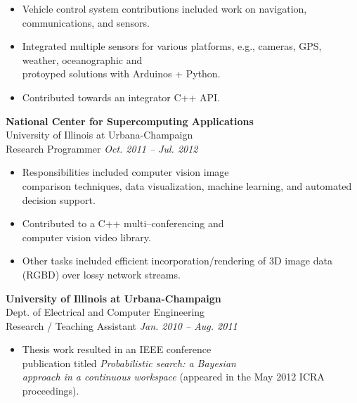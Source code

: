 \documentclass{article}
\begin{document}
{\begin{multicols}{2}
    \begin{itemize}[noitemsep,nolistsep]
        \item Vehicle control system contributions included work on navigation, communications, and sensors.
        \item Integrated multiple sensors for various platforms, e.g., cameras, GPS, weather, oceanographic and \\protoyped solutions with Arduinos + Python.
        \item Contributed towards an integrator C++ API.
    \end{itemize}
    \vspace{10px}
    \textbf{National Center for Supercomputing Applications}\\
    University of Illinois at Urbana-Champaign\\
    Research Programmer \hfill \textsl{Oct. 2011 -- Jul. 2012}\\
    \vspace{ -10px}
    \begin{itemize}[noitemsep,nolistsep]
        \item Responsibilities included computer vision image \\comparison techniques, data visualization, machine learning, and automated decision support. 
        \item Contributed to a C++ multi--conferencing and \\computer vision video library.  
        \item Other tasks included efficient incorporation/rendering of 3D image data (RGBD) over lossy network streams.  
    \end{itemize}
    \vspace{10px}
    \textbf{University of Illinois at Urbana-Champaign}\\ 
    Dept. of Electrical and Computer Engineering\\
    Research / Teaching Assistant \hfill \textsl{Jan. 2010 -- Aug. 2011} \\
    \vspace{ -10px}
    \begin{itemize}[noitemsep,nolistsep]
	 \item Thesis work resulted in an IEEE conference \\publication titled \textsl{Probabilistic search: a Bayesian \\approach in a continuous workspace} (appeared in the May 2012 ICRA proceedings).  

\end{itemize}
\end{multicols}}
\end{document}
